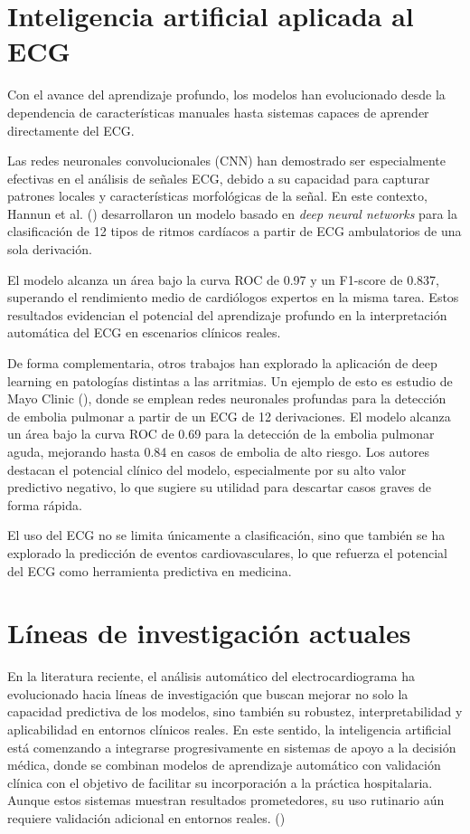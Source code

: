 \documentclass[12pt,a4paper,twoside]{book}
\begin{document}
\section{Inteligencia artificial aplicada al ECG}

Con el avance del aprendizaje profundo, los modelos han evolucionado desde la dependencia de características manuales hasta sistemas capaces de aprender directamente del ECG.

Las redes neuronales convolucionales (CNN) han demostrado ser especialmente efectivas en el análisis de señales ECG, debido a su capacidad para capturar patrones locales y características morfológicas de la señal. 
En este contexto, Hannun et al. (\cite{hannun2019arrhythmia}) desarrollaron un modelo basado en \textit{deep neural networks} para la clasificación de 12 tipos de ritmos cardíacos a partir de ECG ambulatorios de una sola derivación. 

El modelo alcanza un área bajo la curva ROC de 0.97 y un F1-score de 0.837, superando el rendimiento medio de cardiólogos expertos en la misma tarea. 
Estos resultados evidencian el potencial del aprendizaje profundo en la interpretación automática del ECG en escenarios clínicos reales.

De forma complementaria, otros trabajos han explorado la aplicación de deep learning en patologías distintas a las arritmias. 
Un ejemplo de esto es estudio de Mayo Clinic (\cite{wysokinski2024pe_ecg}), donde se emplean redes neuronales profundas para la detección de embolia pulmonar a partir de un ECG de 12 derivaciones.
El modelo alcanza un área bajo la curva ROC de 0.69 para la detección de la embolia pulmonar aguda, mejorando hasta 0.84 en casos de embolia de alto riesgo.
Los autores destacan el potencial clínico del modelo, especialmente por su alto valor predictivo negativo, lo que sugiere su utilidad para descartar casos graves de forma rápida.

El uso del ECG no se limita únicamente a clasificación, sino que también se ha explorado la predicción de eventos cardiovasculares, lo que refuerza el potencial del ECG como herramienta predictiva en medicina.

\section{Líneas de investigación actuales}

En la literatura reciente, el análisis automático del electrocardiograma ha evolucionado hacia líneas de investigación que buscan mejorar no solo la capacidad predictiva de los modelos, sino también su robustez, interpretabilidad y aplicabilidad en entornos clínicos reales. 
En este sentido, la inteligencia artificial está comenzando a integrarse progresivamente en sistemas de apoyo a la decisión médica, donde se combinan modelos de aprendizaje automático con validación clínica con el objetivo de facilitar su incorporación a la práctica hospitalaria. 
Aunque estos sistemas muestran resultados prometedores, su uso rutinario aún requiere validación adicional en entornos reales. (\cite{esc_ai_ecg_diagnostics})
\end{document}

